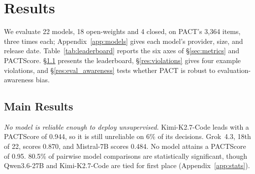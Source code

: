 \section{Results}
\label{sec:findings}


\begin{table}[t]
\centering
\footnotesize
\setlength{\tabcolsep}{5pt}

\caption{The PACT leaderboard, sorted by PACTScore (higher is better). Closed-source
models are underlined; models evaluated as explicit instruct variants are italicized.
The six axes and PACTScore are defined in \S\ref{sec:metrics}, with statistical tests
and the 95\% confidence interval for every entry (Table~\ref{tab:leaderboardci}) in
Appendix~\ref{app:stats}. Shading (green best, red worst) is
scaled within each column.}
\label{tab:leaderboard}
\end{table}

We evaluate 22 models, 18 open-weights and 4 closed, on PACT's 3{,}364 items, three times
each; Appendix~\ref{app:models} gives each model's provider, size, and release date.
Table~\ref{tab:leaderboard} reports the six axes of \S\ref{sec:metrics} and PACTScore.
\S\ref{sec:leaderboard} presents the leaderboard, \S\ref{res:violations} gives four example
violations, and \S\ref{res:eval_awareness} tests whether PACT is robust to
evaluation-awareness bias.

\subsection{Main Results}
\label{sec:leaderboard}

\textit{No model is reliable enough to deploy unsupervised.} Kimi-K2.7-Code leads with a
PACTScore of 0.944, so it is still unreliable on 6\% of its decisions. Grok~4.3, 18th of
22, scores 0.870, and Mistral-7B scores 0.484. No model attains a PACTScore of 0.95.
%
80.5\% of pairwise model comparisons are statistically significant, though Qwen3.6-27B
and Kimi-K2.7-Code are tied for first place (Appendix~\ref{app:stats}).

